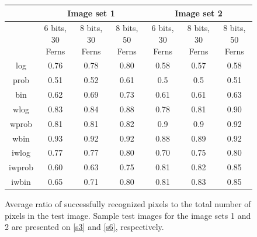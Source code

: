 \documentclass[10pt,twocolumn, a4paper]{article}
\begin{document}
\begin{figure}[t]

\begin{tabular}{|c||c|c|c||c|c|c|}

                                                                            \hline
   {}  &  \multicolumn{3}{|c||}{Image set 1}  &\multicolumn{3}{|c|}{Image set 2}    \\\hline
   {}  & {6 bits, 30 Ferns} & {8 bits, 30 Ferns}& {8 bits, 50 Ferns} &{6 bits, 30 Ferns}  &{8 bits, 30 Ferns}&{8 bits, 50 Ferns} \\\hline

 {log}  & {0.76} & {0.78}& {0.80} &{0.58}  &{0.57}&{0.58} \\\hline
 {prob}  & {0.51} & {0.52}& {0.61} &{0.5}  &{0.5}&{0.51} \\\hline
 {bin}  & {0.62} & {0.69}& {0.73} &{0.61}  &{0.61}&{0.63} \\\hline

 {wlog}  & {0.83} & {0.84}& {0.88} &{0.78}  &{0.81}&{0.90} \\\hline
 {wprob}  & {0.81} & {0.81}& {0.82} &{0.9}  &{0.9}&{0.92} \\\hline
 {wbin}  & {0.93} & {0.92}& {0.92} &{0.88}  &{0.89}&{0.92} \\\hline


{iwlog}  & {0.77} & {0.77}& {0.80} &{0.70}  &{0.75}&{0.80} \\\hline
 {iwprob}  & {0.60} & {0.63}& {0.75} &{0.81}  &{0.82}&{0.85} \\\hline
 {iwbin}  & {0.65} & {0.71}& {0.80} &{0.81}  &{0.83}&{0.85} \\\hline
\end{tabular}
\caption{Average ratio of successfully recognized pixels to the total number of pixels in the test image. Sample test images for the image sets 1 and 2 are presented on \ref{s3} and \ref{s6}, respectively.}
\label{tbl1}
\end{figure}
\end{document}
